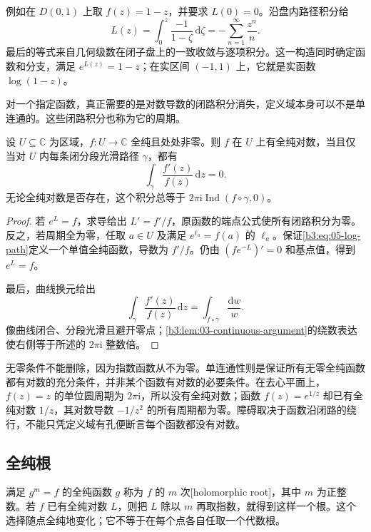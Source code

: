 例如在 \(D(0,1)\) 上取 \(f(z)=1-z\)，并要求 \(L(0)=0\)。沿盘内路径积分给
\[
 L(z)=\int_0^z\frac{-1}{1-\zeta}\,\mathrm{d}\zeta
     =-\sum_{n=1}^{\infty}\frac{z^n}{n}.
\]
最后的等式来自几何级数在闭子盘上的一致收敛与逐项积分。这一构造同时确定函数和分支，满足 \(e^{L(z)}=1-z\)；在实区间 \((-1,1)\) 上，它就是实函数 \(\log(1-z)\)。

\ProseParagraphBreak

对一个指定函数，真正需要的是对数导数的闭路积分消失，定义域本身可以不是单连通的。这些闭路积分也称为它的周期。

\begin{proposition}[全纯对数的周期判别]\label{b3:prop:05-log-periods}
设 \(U\subseteq\mathbb C\) 为区域，\(f:U\to\mathbb C\) 全纯且处处非零。则 \(f\) 在 \(U\) 上有全纯对数，当且仅当对 \(U\) 内每条闭分段光滑路径 \(\gamma\)，都有
\[
 \int_\gamma\frac{f'(z)}{f(z)}\,\mathrm{d}z=0.
\]
无论全纯对数是否存在，这个积分总等于 \(2\pi\mathrm{i}\operatorname{Ind}(f\circ\gamma,0)\)。
\end{proposition}
\begin{proof}
若 \(e^L=f\)，求导给出 \(L'=f'/f\)，原函数的端点公式使所有闭路积分为零。反之，若周期全为零，任取 \(a\in U\) 及满足 \(e^{\ell_a}=f(a)\) 的 \(\ell_a\)。保证\eqref{b3:eq:05-log-path}定义一个单值全纯函数，导数为 \(f'/f\)。仍由 \((fe^{-L})'=0\) 和基点值，得到 \(e^L=f\)。

最后，曲线换元给出
\[
 \int_\gamma\frac{f'(z)}{f(z)}\,\mathrm{d}z
 =\int_{f\circ\gamma}\frac{\mathrm{d}w}{w}.
\]
像曲线闭合、分段光滑且避开零点；\cref{b3:lem:03-continuous-argument}的绕数表达使右侧等于所述的 \(2\pi\mathrm{i}\) 整数倍。
\end{proof}

无零条件不能删除，因为指数函数从不为零。单连通性则是保证所有无零全纯函数都有对数的充分条件，并非某个函数有对数的必要条件。在去心平面上，\(f(z)=z\) 的单位圆周期为 \(2\pi\mathrm{i}\)，所以没有全纯对数；函数 \(f(z)=e^{1/z}\) 却已有全纯对数 \(1/z\)，其对数导数 \(-1/z^2\) 的所有周期都为零。障碍取决于函数沿闭路的绕行，不能只凭定义域有孔便断言每个函数都没有对数。

\subsection{全纯根}
\label{b3:subsec:050103}

满足 \(g^m=f\) 的全纯函数 \(g\) 称为 \(f\) 的 \(m\) 次[holomorphic root]，其中 \(m\) 为正整数。若 \(f\) 已有全纯对数 \(L\)，则把 \(L\) 除以 \(m\) 再取指数，就得到这样一个根。这个选择随点全纯地变化；它不等于在每个点各自任取一个代数根。

